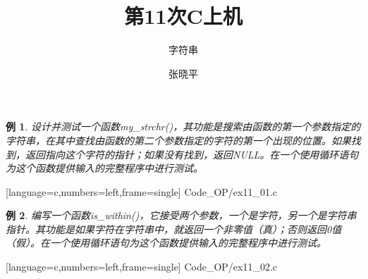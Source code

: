 \documentclass[10pt,notheorems]{beamer}
\newtheorem{li}{例}
\begin{document}
\title{第11次C上机}
\subtitle{字符串}
\author{张晓平}


\begin{frame}[plain]\transboxout
\titlepage
\end{frame}




\begin{frame}[fragile]
\begin{li} 
设计并测试一个函数{\tf my\_strchr()}，其功能是搜索由函数的第一个参数指定的字符串，在其中查找由函数的第二个参数指定的字符的第一个出现的位置。如果找到，返回指向这个字符的指针；如果没有找到，返回{\tf NULL}。在一个使用循环语句为这个函数提供输入的完整程序中进行测试。
\end{li}
\end{frame}


\begin{frame}

[language=c,numbers=left,frame=single]
{Code_OP/ex11_01.c}
\end{frame}


\begin{frame}[fragile]
\begin{li} 
编写一个函数{\tf is\_within()}，它接受两个参数，一个是字符，另一个是字符串指针。其功能是如果字符在字符串中，就返回一个非零值（真）；否则返回0值（假）。在一个使用循环语句为这个函数提供输入的完整程序中进行测试。
\end{li}
\end{frame}


\begin{frame}

[language=c,numbers=left,frame=single]
{Code_OP/ex11_02.c}
\end{frame}
\end{document}
